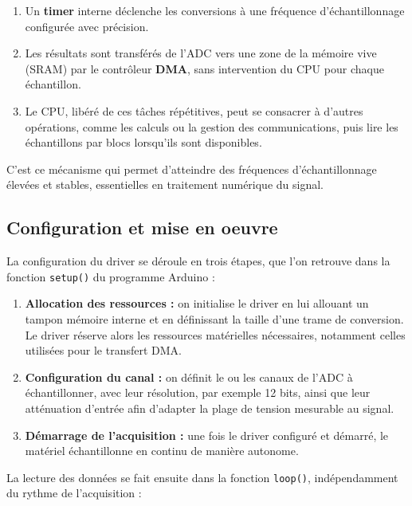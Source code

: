 \begin{enumerate}
    \item Un \textbf{timer} interne déclenche les conversions à une fréquence d'échantillonnage configurée avec précision.
    \item Les résultats sont transférés de l'ADC vers une zone de la mémoire vive (SRAM) par le contrôleur \textbf{DMA}, sans intervention du CPU pour chaque échantillon.
    \item Le CPU, libéré de ces tâches répétitives, peut se consacrer à d'autres opérations, comme les calculs ou la gestion des communications, puis lire les échantillons par blocs lorsqu'ils sont disponibles.
\end{enumerate}

C'est ce mécanisme qui permet d'atteindre des fréquences d'échantillonnage élevées et stables, essentielles en traitement numérique du signal.

\subsection{Configuration et mise en oeuvre}

La configuration du driver se déroule en trois étapes, que l'on retrouve dans la fonction \texttt{setup()} du programme Arduino :

\begin{enumerate}
    \item \textbf{Allocation des ressources :} on initialise le driver en lui allouant un tampon mémoire interne et en définissant la taille d'une trame de conversion. Le driver réserve alors les ressources matérielles nécessaires, notamment celles utilisées pour le transfert DMA.
    
    \item \textbf{Configuration du canal :} on définit le ou les canaux de l'ADC à échantillonner, avec leur résolution, par exemple 12 bits, ainsi que leur atténuation d'entrée afin d'adapter la plage de tension mesurable au signal.
    
    \item \textbf{Démarrage de l'acquisition :} une fois le driver configuré et démarré, le matériel échantillonne en continu de manière autonome.
\end{enumerate}

La lecture des données se fait ensuite dans la fonction \texttt{loop()}, indépendamment du rythme de l'acquisition :

